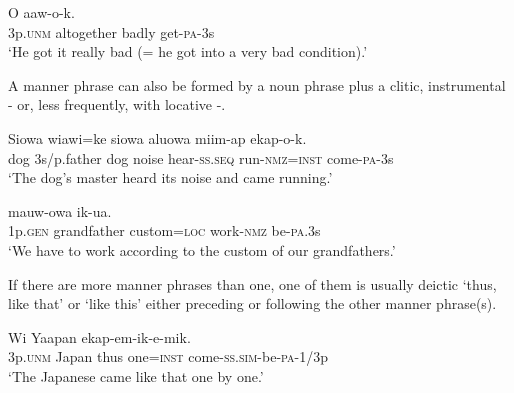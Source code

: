 \ea%
\label{ex:x881}
\gll O     aaw-o-k.  \\
  3p.\textsc{unm}  altogether  badly  get-\textsc{pa}-3s    \\
\glt`He got it really bad (= he got into a very bad condition).'
\z





A manner phrase can also be formed by a noun phrase plus a clitic, instrumental \nobreakdash- or, less frequently, with locative -.  

\ea%
\label{ex:x882}
\gll Siowa  wiawi=ke  siowa  aluowa  miim-ap   ekap-o-k.\\
  dog  3s/p.father  dog  noise  hear-\textsc{ss}.\textsc{seq}  run-\textsc{nmz}=\textsc{inst}  come-\textsc{pa}-3s    \\
\glt`The dog's master heard its noise and came running.'
\z









\ea%
\label{ex:x884}
\gll {}    mauw-owa  ik-ua. \\
 1p.\textsc{gen}  grandfather  custom=\textsc{loc}  work-\textsc{nmz}  be-\textsc{pa}.3s     \\
\glt`We have to work according to the custom of our grandfathers.'
\z





If there are more manner phrases than one, one of them is usually deictic  `thus, like that' or  `like this' either preceding or following the other manner phrase(s).

\ea%
\label{ex:x883}
\gll Wi  Yaapan     ekap-em-ik-e-mik. \\
  3p.\textsc{unm}  Japan  thus  one=\textsc{inst}  come-\textsc{ss}.\textsc{sim}-be-\textsc{pa}-1/3p    \\
\glt`The Japanese came like that one by one.'
\z






